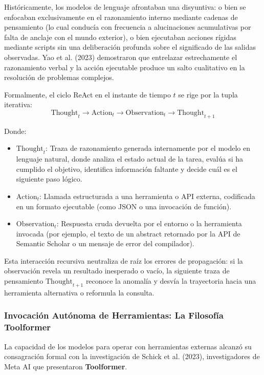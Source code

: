Históricamente, los modelos de lenguaje afrontaban una disyuntiva: o bien se enfocaban exclusivamente en el razonamiento interno mediante cadenas de pensamiento (lo cual conducía con frecuencia a alucinaciones acumulativas por falta de anclaje con el mundo exterior), o bien ejecutaban acciones rígidas mediante scripts sin una deliberación profunda sobre el significado de las salidas observadas. Yao et al. (2023) demostraron que entrelazar estrechamente el razonamiento verbal y la acción ejecutable produce un salto cualitativo en la resolución de problemas complejos.

Formalmente, el ciclo ReAct en el instante de tiempo $t$ se rige por la tupla iterativa:
\begin{equation}
    \mathrm{Thought}_t \longrightarrow \mathrm{Action}_t \longrightarrow \mathrm{Observation}_t \longrightarrow \mathrm{Thought}_{t+1}
\end{equation}

Donde:
\begin{itemize}
    \item $\mathrm{Thought}_t$: Traza de razonamiento generada internamente por el modelo en lenguaje natural, donde analiza el estado actual de la tarea, evalúa si ha cumplido el objetivo, identifica información faltante y decide cuál es el siguiente paso lógico.
    \item $\mathrm{Action}_t$: Llamada estructurada a una herramienta o API externa, codificada en un formato ejecutable (como JSON o una invocación de función).
    \item $\mathrm{Observation}_t$: Respuesta cruda devuelta por el entorno o la herramienta invocada (por ejemplo, el texto de un abstract retornado por la API de Semantic Scholar o un mensaje de error del compilador).
\end{itemize}

Esta interacción recursiva neutraliza de raíz los errores de propagación: si la observación revela un resultado inesperado o vacío, la siguiente traza de pensamiento $\mathrm{Thought}_{t+1}$ reconoce la anomalía y desvía la trayectoria hacia una herramienta alternativa o reformula la consulta.

\subsubsection{Invocación Autónoma de Herramientas: La Filosofía Toolformer}

La capacidad de los modelos para operar con herramientas externas alcanzó su consagración formal con la investigación de Schick et al. (2023), investigadores de Meta AI que presentaron \textbf{Toolformer}. 

